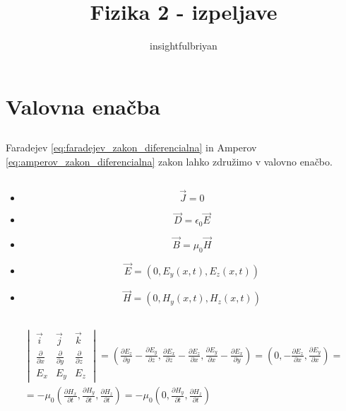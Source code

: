 \documentclass[a4paper,12pt]{article}
\title{Fizika 2 - izpeljave}
\author{insightfulbriyan}
\begin{document}
\pagestyle{empty}

\begin{titlingpage}
    \maketitle
\end{titlingpage}

\section{Valovna enačba}
\subsection{}
Faradejev \ref{eq:faradejev_zakon_diferencialna} in Amperov \ref{eq:amperov_zakon_diferencialna} zakon lahko združimo v valovno enačbo.

\subsection{}
\begin{itemize}[itemsep=-20pt]
    \item $$\vec J = 0$$
    \item $$\vec D = \epsilon_0 \vec E$$
    \item $$\vec B = \mu_0 \vec H$$
    \item $$\vec E = (0, E_y(x, t), E_z(x, t))$$
    \item $$\vec H = (0, H_y(x, t), H_z(x, t))$$
\end{itemize}

\subsection{}
\begin{multline}
    \begin{vmatrix}
        \vec{i}                     & \vec{j}                     & \vec{k}                     \\
        \frac{\partial}{\partial x} & \frac{\partial}{\partial y} & \frac{\partial}{\partial z} \\
        E_x                         & E_y                         & E_z
    \end{vmatrix} = \left( \frac{\partial E_z}{\partial y} - \frac{\partial E_y}{\partial z}, \frac{\partial E_x}{\partial z} - \frac{\partial E_z}{\partial x}, \frac{\partial E_y}{\partial x} - \frac{\partial E_x}{\partial y} \right)
    = \left( 0, -\frac{\partial E_z}{\partial x}, \frac{\partial E_y}{\partial x} \right) = \\
    = -\mu_0 \left( \frac{\partial H_x}{\partial t}, \frac{\partial H_y}{\partial t}, \frac{\partial H_z}{\partial t} \right) = -\mu_0 \left( 0, \frac{\partial H_y}{\partial t}, \frac{\partial H_z}{\partial t} \right)
\end{multline}
\end{document}
